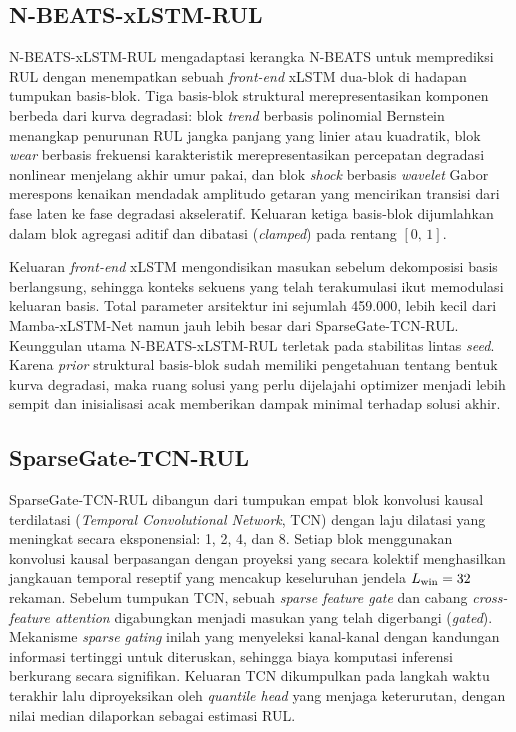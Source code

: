\subsection{N-BEATS-xLSTM-RUL}
\label{subsec:bab5_nbeats_xlstm}

N-BEATS-xLSTM-RUL mengadaptasi kerangka N-BEATS 
untuk memprediksi RUL dengan {\color{blue}menempatkan sebuah
\emph{front-end} xLSTM dua-blok di hadapan tumpukan basis-blok}.
Tiga basis-blok struktural merepresentasikan komponen berbeda dari kurva
degradasi: blok \emph{trend} {\color{blue}berbasis polinomial Bernstein}
menangkap penurunan RUL jangka panjang yang linier atau kuadratik, blok
\emph{wear} {\color{blue}berbasis frekuensi karakteristik}
merepresentasikan percepatan degradasi nonlinear menjelang akhir umur pakai,
dan blok \emph{shock} {\color{blue}berbasis \emph{wavelet} Gabor}
merespons kenaikan mendadak amplitudo getaran yang mencirikan transisi dari
fase laten ke fase degradasi akseleratif.
{\color{blue}Keluaran ketiga basis-blok dijumlahkan dalam blok agregasi
aditif dan dibatasi (\emph{clamped}) pada rentang $[0,\,1]$.}

{\color{blue}Keluaran \emph{front-end} xLSTM mengondisikan masukan
sebelum dekomposisi basis berlangsung}, sehingga konteks sekuens yang
telah terakumulasi ikut memodulasi keluaran basis.
Total parameter arsitektur ini sejumlah 459.000, lebih kecil dari
Mamba-xLSTM-Net namun jauh lebih besar dari SparseGate-TCN-RUL.
Keunggulan utama N-BEATS-xLSTM-RUL terletak pada stabilitas lintas
\emph{seed}. Karena \emph{prior} struktural basis-blok sudah memiliki
pengetahuan tentang bentuk kurva degradasi, maka ruang solusi yang perlu dijelajahi
optimizer menjadi lebih sempit dan inisialisasi acak memberikan dampak minimal
terhadap solusi akhir.

\subsection{SparseGate-TCN-RUL}
\label{subsec:bab5_sparsegate_tcn}

SparseGate-TCN-RUL dibangun dari tumpukan {\color{blue}empat} blok konvolusi
kausal terdilatasi (\emph{Temporal Convolutional Network}, TCN) dengan laju
dilatasi yang meningkat secara eksponensial: {\color{blue}1, 2, 4, dan 8}.
Setiap blok menggunakan konvolusi kausal berpasangan dengan proyeksi yang
secara kolektif menghasilkan jangkauan temporal reseptif yang mencakup
keseluruhan jendela $L_{\rm win} = 32$ rekaman.
{\color{blue}Sebelum tumpukan TCN, sebuah \emph{sparse feature gate}
dan cabang \emph{cross-feature attention} digabungkan menjadi masukan
yang telah digerbangi (\emph{gated}). Mekanisme \emph{sparse gating} inilah yang menyeleksi kanal-kanal
dengan kandungan informasi tertinggi untuk diteruskan, sehingga biaya
komputasi inferensi berkurang secara signifikan.}
Keluaran TCN dikumpulkan pada langkah waktu terakhir lalu diproyeksikan
oleh \emph{quantile head} yang menjaga keterurutan, dengan nilai median
dilaporkan sebagai estimasi RUL.

